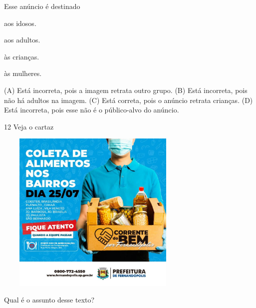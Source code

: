 Esse anúncio é destinado

\begin{minipage}{.5\textwidth}
\begin{escolha}
\item aos idosos.

\item aos adultos.

\item às crianças.

\item às mulheres.
\end{escolha}
\end{minipage}

(A) Está incorreta, pois a imagem retrata outro grupo.
(B) Está incorreta, pois não há adultos na imagem.
(C) Está correta, pois o anúncio retrata crianças.
(D) Está incorreta, pois esse não é o público-alvo do anúncio.

\num{12} Veja o cartaz

\includegraphics[width=3.71207in,height=3.06667in]{media/image171.jpeg}


Qual é o assunto desse texto?

